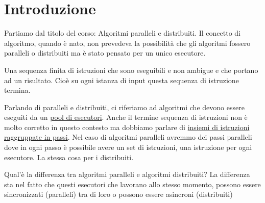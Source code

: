 \section{Introduzione}
Partiamo dal titolo del corso: Algoritmi paralleli e distribuiti.
Il concetto di algoritmo, quando è nato, non prevedeva la possibilità che gli algoritmi fossero paralleli o distribuiti ma è stato pensato per un unico esecutore.

\begin{definizione}
    Una sequenza finita di istruzioni che sono eseguibili e non ambigue e che portano ad un risultato. Cioè su ogni istanza di input questa sequenza di istruzione termina.
\end{definizione}

Parlando di paralleli e distribuiti, ci riferiamo ad algoritmi che devono essere eseguiti da un \uline{pool di esecutori}. Anche il termine sequenza di istruzioni non è molto corretto in questo contesto ma dobbiamo parlare di \uline{insiemi di istruzioni raggruppate in passi}. Nel caso di algoritmi paralleli avremmo dei passi paralleli dove in ogni passo è possibile avere un set di istruzioni, una istruzione per ogni esecutore. La stessa cosa per i distribuiti. 

Qual'è la differenza tra algoritmi paralleli e algoritmi distribuiti? La differenza sta nel fatto che questi esecutori che lavorano allo stesso momento, possono essere sincronizzati (paralleli) tra di loro o possono essere asincroni (distribuiti)

